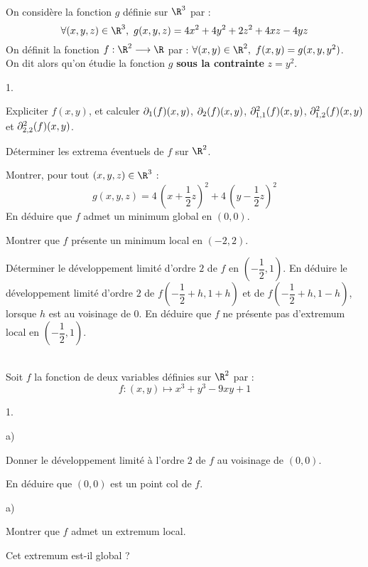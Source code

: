 \documentclass[11pt]{article}%
\begin{document}
\begin{exercice}[INSEEC 2002]~\\
\noindent
On considère la fonction $g$ définie sur $\R^3$ par :
\[ 
  \forall (x,y,z)\in\R^3,\ g(x,y,z) = 4x^2+4y^2+2z^2+4xz-4yz
\]
On définit la fonction $f:\R^2\longrightarrow \R$ par : $\forall (x,y)\in\R^2 
, \ f(x,y)=g(x,y,y^2)$.\\
On dit alors qu'on étudie la fonction $g$ \textbf{sous la contrainte} $z=y^2$.
\begin{noliste}{1.}
  \item Expliciter $f(x,y)$, et calculer $\dfn{f}{1}(x,y)$, $\dfn{f}{2}(x,y)$, 
  $\ddfn{f}{1,1}(x,y)$, $\ddfn{f}{1,2}(x,y)$ et $\ddfn{f}{2,2}(x,y)$.
  
  \item Déterminer les extrema éventuels de $f$ sur $\R^2$.
  
  \item Montrer, pour tout $(x,y,z)\in\R^3$ : 
  \[
    g(x,y,z) = 4 \, \left(x+\dfrac{1}{2}z\right)^2 + 4 \, 
    \left(y-\dfrac{1}{2}z\right)^2
  \]
  En déduire que $f$ admet un minimum global en $(0,0)$.
  
  \item Montrer que $f$ présente un minimum local en $(-2,2)$.
  
  \item Déterminer le développement limité d'ordre $2$ de $f$ en 
  $\left(-\dfrac{1}{2},1\right)$. En déduire le développement limité d'ordre 
  $2$ de $f\left(-\dfrac{1}{2}+h,1+h\right)$ et de 
  $f\left(-\dfrac{1}{2}+h,1-h\right)$, lorsque $h$ est au voisinage de $0$. En 
  déduire que $f$ ne présente pas d'extremum local 
  en $\left(-\dfrac{1}{2},1\right).$
\end{noliste}
\end{exercice}



\begin{exercice}[HEC 2017]~\\
  \noindent
  Soit $f$ la fonction de deux variables définies sur $\R^2$ par :
  \[
    f : (x,y) \mapsto x^3 + y^3 -9xy +1
  \]
  \begin{noliste}{1.}
    \item 
    \begin{noliste}{a)}
      \item Donner le développement limité à l'ordre $2$ de $f$ au voisinage 
      de $(0,0)$.
      
      \item En déduire que $(0,0)$ est un point col de $f$.
    \end{noliste}
    
    \item 
    \begin{noliste}{a)}
      \item Montrer que $f$ admet un extremum local.
      
      \item Cet extremum est-il global ?
    \end{noliste}
  \end{noliste}
\end{exercice}
\end{document}
